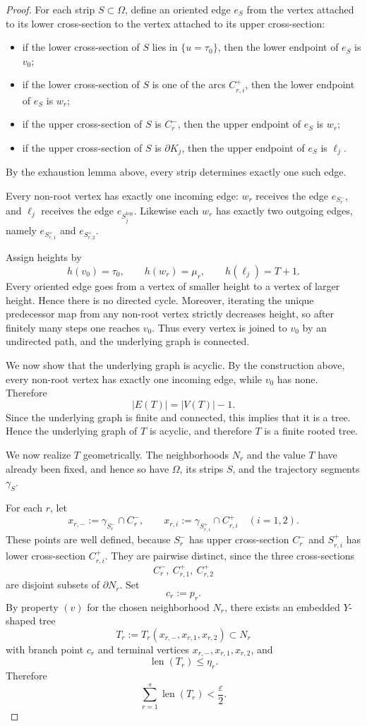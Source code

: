 \documentclass[12pt]{amsart}
\theoremstyle{definition}
\theoremstyle{remark}
\begin{document}
\begin{proof}
For each strip $S\subset\Omega$, define an oriented edge $e_S$ from the vertex attached
to its lower cross-section to the vertex attached to its upper cross-section:
\begin{itemize}
\item if the lower cross-section of $S$ lies in $\{u=\tau_0\}$, then the lower endpoint
      of $e_S$ is $v_0$;
\item if the lower cross-section of $S$ is one of the arcs $C_{r,i}^+$, then the lower
      endpoint of $e_S$ is $w_r$;
\item if the upper cross-section of $S$ is $C_r^-$, then the upper endpoint of $e_S$ is
      $w_r$;
\item if the upper cross-section of $S$ is $\partial K_j$, then the upper endpoint of
      $e_S$ is $\ell_j$.
\end{itemize}
By the exhaustion lemma above, every strip determines exactly one such edge.

Every non-root vertex has exactly one incoming edge:
$w_r$ receives the edge $e_{S_r^-}$, and $\ell_j$ receives the edge
$e_{S_j^{\mathrm{top}}}$.
Likewise each $w_r$ has exactly two outgoing edges, namely
$e_{S_{r,1}^+}$ and $e_{S_{r,2}^+}$.

Assign heights by
\[
h(v_0)=\tau_0,\qquad h(w_r)=\mu_r,\qquad h(\ell_j)=T+1.
\]
Every oriented edge goes from a vertex of smaller height to a vertex of larger height.
Hence there is no directed cycle. Moreover, iterating the unique predecessor map from
any non-root vertex strictly decreases height, so after finitely many steps one reaches
$v_0$. Thus every vertex is joined to $v_0$ by an undirected path, and the underlying
graph is connected.

We now show that the underlying graph is acyclic. By the construction above, every
non-root vertex has exactly one incoming edge, while $v_0$ has none. Therefore
\[
|E(T)| = |V(T)| - 1.
\]
Since the underlying graph is finite and connected, this implies that it is a tree. Hence
the underlying graph of $T$ is acyclic, and therefore $T$ is a finite rooted tree.

We now realize \(T\) geometrically. The neighborhoods \(N_r\) and the value \(T\) have already been fixed, and hence so have \(\Omega\), its strips \(S\), and the trajectory segments \(\gamma_S\).

For each \(r\), let
\[
x_{r,-}:=\gamma_{S_r^-}\cap C_r^-,
\qquad
x_{r,i}:=\gamma_{S_{r,i}^+}\cap C_{r,i}^+
\quad (i=1,2).
\]
These points are well defined, because \(S_r^-\) has upper cross-section \(C_r^-\) and \(S_{r,i}^+\) has lower cross-section \(C_{r,i}^+\). They are pairwise distinct, since the three cross-sections
\[
C_r^-,\ C_{r,1}^+,\ C_{r,2}^+
\]
are disjoint subsets of \(\partial N_r\). Set
\[
c_r:=p_r.
\]
By property \((v)\) for the chosen neighborhood $N_r$, there exists an embedded \(Y\)-shaped tree
\[
T_r:=T_r(x_{r,-},x_{r,1},x_{r,2})\subset N_r
\]
with branch point \(c_r\) and terminal vertices \(x_{r,-},x_{r,1},x_{r,2}\), and
\[
\operatorname{len}(T_r)\le \eta_r.
\]
Therefore
\[
\sum_{r=1}^s \operatorname{len}(T_r)<\frac{\varepsilon}{2}. \tag{12}
\]


\end{proof}
\end{document}
